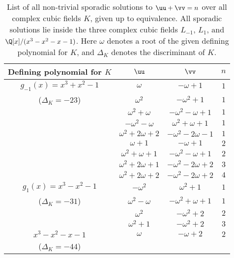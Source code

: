 
\begin{table}[h]
\centering
\caption{List of all non-trivial sporadic solutions to $\uu + \vv = n$ over all complex cubic fields $K$, given up to equivalence. All sporadic solutions lie inside the three complex cubic fields $L_{-1}$, $L_1$, and $\Q[x]/(x^3 - x^2 - x - 1)$.  Here $\omega$ denotes a root of the given defining polynomial for $K$, and $\Delta_K$ denotes the discriminant of $K$.}
\label{tab:complexsolutions}
\begin{tabular}{@{}cccc@{}}
\toprule
\textbf{Defining polynomial for $K$} & \textbf{$\uu$} & \textbf{$\vv$} & \textbf{$n$} \\ \midrule

$g_{-1}(x) = x^3 + x^2 - 1$  &  
$\omega$  &  $-\omega + 1$   &  $1$ \\

($\Delta_K = -23$) &   
$\omega^2$ & $-\omega^2 + 1$  & $1$  \\
 &  $\omega^2 + \omega$ & $-\omega^2 - \omega + 1$  & $1$ \\
 &  $-\omega^2 - \omega$ & $\omega^2 + \omega + 1$  &  $1$\\
 &  $\omega^2 + 2\omega + 2$ &  $-\omega^2 - 2\omega - 1$ &  $1$ \\
 & $\omega + 1$  & $-\omega + 1$ &  $2$ \\
 & $\omega^2 + \omega + 1$  &  $-\omega^2 - \omega + 1$  &  $2$ \\
 & $\omega^2 + 2\omega + 1$    & $-\omega^2 - 2\omega + 2$  & $3$ \\
 & $\omega^2 + 2\omega + 2$  &  $-\omega^2 - 2\omega + 2$ &  $4$ \\[5mm]

\midrule

  $g_{1}(x) =  x^3 - x^2 - 1$  &  
$- \omega^2$ & $\omega^2 + 1$ & $1$  \\
($\Delta_K = -31$) & $ \omega^2 - \omega$ & $ -\omega^2 + \omega + 1$ & $1$  \\
& $\omega^2$ & $-\omega^2 + 2$ & $2$  \\
&   $\omega^2 + 1 $  &  $-\omega^2 + 2$ & $3$ \\[5mm]

\midrule

    $x^3 - x^2 - x - 1$  &  
$\omega $  &  $-\omega+ 2$   &  $2$ \\
($\Delta_K = -44$)  &    &    &  \\[5mm]


\bottomrule
\end{tabular}%
\end{table}

